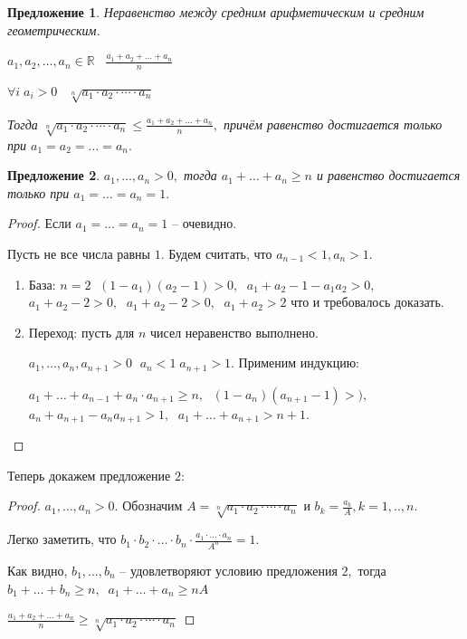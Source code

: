 \documentclass{article}
\newtheorem{Proposition}{Предложение}[section]
\begin{document}
\begin{Proposition}
Неравенство между средним арифметическим и средним геометрическим.

$a_1, a_2,\ldots, a_n\in\mathbb{R} \;\;\; \frac{a_1+a_2+\ldots+a_n}{n}$
\smallskip
\par $\forall i \; a_i>0 \;\;\; \sqrt[n]{a_1\cdot a_2\cdot\cdots\cdot a_n}$

\smallskip
Тогда $\sqrt[n]{a_1\cdot a_2\cdot\cdots\cdot a_n}\leq\frac{a_1+a_2+\ldots+a_n}{n},$ причём равенство достигается только при $a_1=a_2=\ldots=a_n.$
\end{Proposition}

\begin{Proposition}
$a_1,\ldots, a_n>0,$ тогда $a_1+\ldots+a_n\geq n$ и равенство достигается только при $a_1=\ldots=a_n=1.$
\end{Proposition}
\begin{proof}
Если $a_1=\ldots=a_n=1$ -- очевидно.

Пусть не все числа равны $1.$ Будем считать, что $a_{n-1}<1, a_n>1.$
\begin{enumerate}
\item База: $n=2\;$ $(1-a_1)(a_2-1)>0,\;$ $a_1+a_2-1-a_1a_2>0,\;$ $a_1+a_2-2>0,\;$ $a_1+a_2-2>0,\;$ $a_1+a_2>2$ что и требовалось доказать.
\item Переход: пусть для $n$ чисел неравенство выполнено. 

$a_1,\ldots, a_n, a_{n+1}>0\;$ $a_n<1 \; a_{n+1}>1.$ Применим индукцию:

$a_1+\ldots+a_{n-1}+a_n\cdot a_{n+1}\geq n,\;$ $(1-a_n)(a_{n+1}-1)>),\;$ $a_n+a_{n+1}-a_na_{n+1}>1,\;$ $a_1+\ldots+a_{n+1}>n+1.$  
\end{enumerate}
\end{proof}

Теперь докажем предложение $2:$
\begin{proof}
$a_1,\ldots, a_n>0.$ Обозначим $A=\sqrt[n]{a_1\cdot a_2\cdot\cdots\cdot a_n}$ и $b_k=\frac{a_k}{A}, k=1,..,n.$ 

Легко заметить, что $b_1\cdot b_2\cdot\ldots\cdot b_n\cdot\frac{a_1\cdot\ldots\cdot a_n}{A^n}=1.$

Как видно, $b_1,\ldots, b_n$ -- удовлетворяют условию предложения $2,$ тогда $b_1+\ldots+b_n\geq n, \;\; a_1+\ldots+a_n\geq nA$
\par $\frac{a_1+a_2+\ldots+a_n}{n}\geq\sqrt[n]{a_1\cdot a_2\cdot\cdots\cdot a_n}$
\end{proof}
\end{document}
